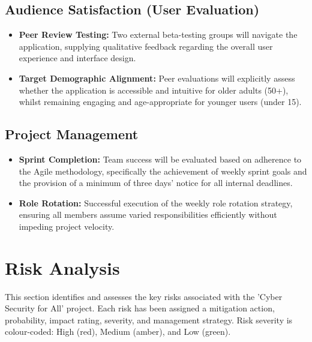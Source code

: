 \documentclass[11pt, a4paper]{report}
\begin{document}
\section{Audience Satisfaction (User Evaluation)}
\begin{itemize}
    \item \textbf{Peer Review Testing:} Two external beta-testing groups will navigate the application, supplying qualitative feedback regarding the overall user experience and interface design.
    \item \textbf{Target Demographic Alignment:} Peer evaluations will explicitly assess whether the application is accessible and intuitive for older adults (50+), whilst remaining engaging and age-appropriate for younger users (under 15).
\end{itemize}

\section{Project Management}
\begin{itemize}
    \item \textbf{Sprint Completion:} Team success will be evaluated based on adherence to the Agile methodology, specifically the achievement of weekly sprint goals and the provision of a minimum of three days' notice for all internal deadlines.
    \item \textbf{Role Rotation:} Successful execution of the weekly role rotation strategy, ensuring all members assume varied responsibilities efficiently without impeding project velocity.
\end{itemize}


\chapter{Risk Analysis}
\label{cp:risk}

This section identifies and assesses the key risks associated with the 'Cyber Security for All' project. Each risk has been assigned a mitigation action, probability, impact rating, severity, and management strategy. Risk severity is colour-coded: High (red), Medium (amber), and Low (green). 
\end{document}

